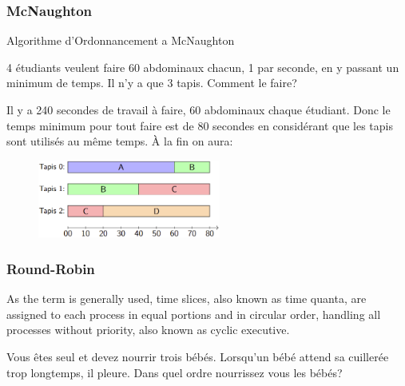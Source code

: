 \documentclass{article}
\begin{document}
\subsubsection{McNaughton}
\begin{definition}
    Algorithme d'Ordonnancement a McNaughton
    \begin{example}
        4 étudiants veulent faire 60 abdominaux chacun, 1 par seconde, en y passant un minimum de temps. Il n'y a que 3 tapis. Comment le faire?
    \end{example}
    \begin{resolution}
        Il y a 240 secondes de travail à faire, 60 abdominaux chaque étudiant. Donc le temps minimum pour tout faire est de 80 secondes en considérant que les tapis sont utilisés au même temps. À la fin on aura:
        \begin{figure}[H]
            \centering
            \includegraphics[width=60mm]{images/mcNaughton_output.png}
        \end{figure}
    \end{resolution}
\end{definition}

\subsubsection{Round-Robin}
\begin{definition}
    As the term is generally used, time slices, also known as time quanta, are assigned to each process in equal portions and in circular order, handling all processes without priority, also known as cyclic executive.
    \begin{example}
        Vous êtes seul et devez nourrir trois bébés. Lorsqu'un bébé attend sa cuillerée trop longtemps, il pleure. Dans quel ordre nourrissez vous les bébés? 
    \end{example}
\end{definition}
\end{document}
